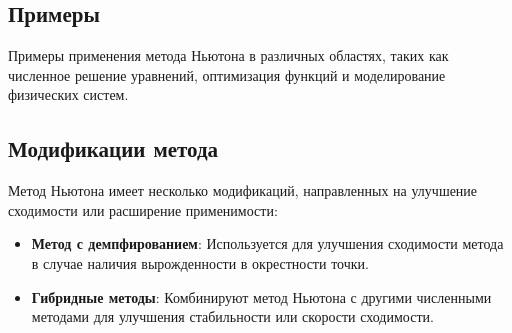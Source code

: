 \documentclass{article}
\begin{document}
\subsection{Примеры}

Примеры применения метода Ньютона в различных областях, таких как численное решение уравнений, оптимизация функций и моделирование физических систем.

\subsection{Модификации метода}

Метод Ньютона имеет несколько модификаций, направленных на улучшение сходимости или расширение применимости:

\begin{itemize}
  \item \textbf{Метод с демпфированием}: Используется для улучшения сходимости метода в случае наличия вырожденности в окрестности точки.
  \item \textbf{Гибридные методы}: Комбинируют метод Ньютона с другими численными методами для улучшения стабильности или скорости сходимости.
\end{itemize}
\end{document}
